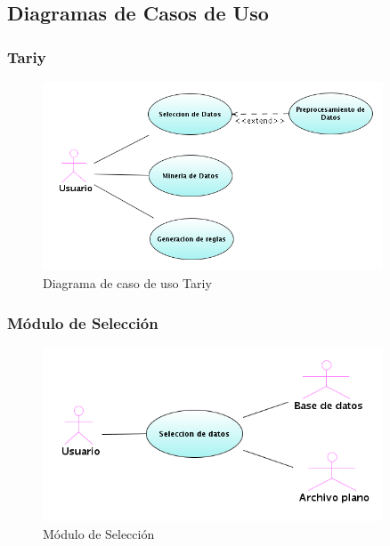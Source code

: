 \subsection{Diagramas de Casos de Uso}
\addtolength{\hoffset}{1cm}
\addtolength{\voffset}{1cm}
\subsubsection{Tariy}
\begin{figure}[h]
 \centering
 \includegraphics[width=0.9\textwidth]{imgsCasosUso/01tariy.png}
 \caption{Diagrama de caso de uso Tariy}
\end{figure}
\newpage

\subsubsection{M\'odulo de Selecci\'on}
\begin{figure}[h]
 \centering
 \includegraphics[width=0.9\textwidth]{imgsCasosUso/02seleccion.png}
 \caption{M\'odulo de Selecci\'on}
\end{figure}

